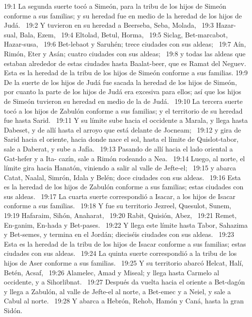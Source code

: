 19:1 La segunda suerte tocó a Simeón, para la tribu de los hijos de Simeón conforme a sus familias; y su heredad fue en medio de la heredad de los hijos de Judá.  
19:2 Y tuvieron en su heredad a Beerseba, Seba, Molada,  
19:3 Hazar-sual, Bala, Ezem,  
19:4 Eltolad, Betul, Horma,  
19:5 Siclag, Bet-marcabot, Hazar-susa,  
19:6 Bet-lebaot y Saruhén; trece ciudades con sus aldeas;  
19:7 Aín, Rimón, Eter y Asán; cuatro ciudades con sus aldeas;  
19:8 y todas las aldeas que estaban alrededor de estas ciudades hasta Baalat-beer, que es Ramat del Neguev. Esta es la heredad de la tribu de los hijos de Simeón conforme a sus familias. 
19:9 De la suerte de los hijos de Judá fue sacada la heredad de los hijos de Simeón, por cuanto la parte de los hijos de Judá era excesiva para ellos; así que los hijos de Simeón tuvieron su heredad en medio de la de Judá.  
19:10 La tercera suerte tocó a los hijos de Zabulón conforme a sus familias; y el territorio de su heredad fue hasta Sarid.  
19:11 Y su límite sube hacia el occidente a Marala, y llega hasta Dabeset, y de allí hasta el arroyo que está delante de Jocneam;  
19:12 y gira de Sarid hacia el oriente, hacia donde nace el sol, hasta el límite de Quislot-tabor, sale a Daberat, y sube a Jafía.  
19:13 Pasando de allí hacia el lado oriental a Gat-hefer y a Ita- cazín, sale a Rimón rodeando a Nea.  
19:14 Luego, al norte, el límite gira hacia Hanatón, viniendo a salir al valle de Jefte-el;  
19:15 y abarca Catat, Naalal, Simrón, Idala y Belén; doce ciudades con sus aldeas.  
19:16 Esta es la heredad de los hijos de Zabulón conforme a sus familias; estas ciudades con sus aldeas.  
19:17 La cuarta suerte correspondió a Isacar, a los hijos de Isacar conforme a sus familias.  
19:18 Y fue su territorio Jezreel, Quesulot, Sunem,  
19:19 Hafaraim, Sihón, Anaharat,  
19:20 Rabit, Quisión, Abez,  
19:21 Remet, En-ganim, En-hada y Bet-pases.  
19:22 Y llega este límite hasta Tabor, Sahazima y Bet-semes, y termina en el Jordán; dieciséis ciudades con sus aldeas.  
19:23 Esta es la heredad de la tribu de los hijos de Isacar conforme a sus familias; estas ciudades con sus aldeas.  
19:24 La quinta suerte correspondió a la tribu de los hijos de Aser conforme a sus familias.  
19:25 Y su territorio abarcó Helcat, Halí, Betén, Acsaf,  
19:26 Alamelec, Amad y Miseal; y llega hasta Carmelo al occidente, y a Sihorlibnat.  
19:27 Después da vuelta hacia el oriente a Bet-dagón y llega a Zabulón, al valle de Jefte-el al norte, a Bet-emec y a Neiel, y sale a Cabul al norte.  
19:28 Y abarca a Hebrón, Rehob, Hamón y Caná, hasta la gran Sidón.  
